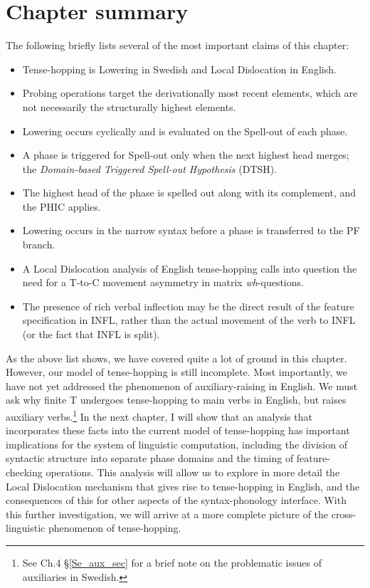 \section{Chapter summary}
The following briefly lists several of the most important claims of this chapter:

\singlespacing
\begin{itemize}
\item Tense-hopping is Lowering in Swedish and Local Dislocation in English.
\item Probing operations target the derivationally most recent elements, which are not necessarily the structurally highest elements.
\item Lowering occurs cyclically and is evaluated on the Spell-out of each phase.
\item A phase is triggered for Spell-out only when the next highest head merges; the {\it Domain-based Triggered Spell-out Hypothesis} (DTSH).
\item The highest head of the phase is spelled out along with its complement, and the PHIC applies.
\item Lowering occurs in the narrow syntax before a phase is transferred to the PF branch.
\item A Local Dislocation analysis of English tense-hopping calls into question the need for a T-to-C movement asymmetry in matrix {\it wh}-questions.
\item The presence of rich verbal inflection may be the direct result of the feature specification in INFL, rather than the actual movement of the verb to INFL (or the fact that INFL is split).
\end{itemize}
\onehalfspacing
As the above list shows, we have covered quite a lot of ground in this chapter. However, our model of tense-hopping is still incomplete. Most importantly, we have not yet addressed the phenomenon of auxiliary-raising in English. We must ask why finite T undergoes tense-hopping to main verbs in English, but raises auxiliary verbs.\footnote{See Ch.4 \S\ref{Se_aux_sec} for a brief note on the problematic issues of auxiliaries in Swedish.} In the next chapter, I will show that an analysis that incorporates these facts into the current model of tense-hopping has important implications for the system of linguistic computation, including the division of syntactic structure into separate phase domains and the timing of feature-checking operations. This analysis will allow us to explore in more detail the Local Dislocation mechanism that gives rise to tense-hopping in English, and the consequences of this for other aspects of the syntax-phonology interface. With this further investigation, we will arrive at a more complete picture of the cross-linguistic phenomenon of tense-hopping.

